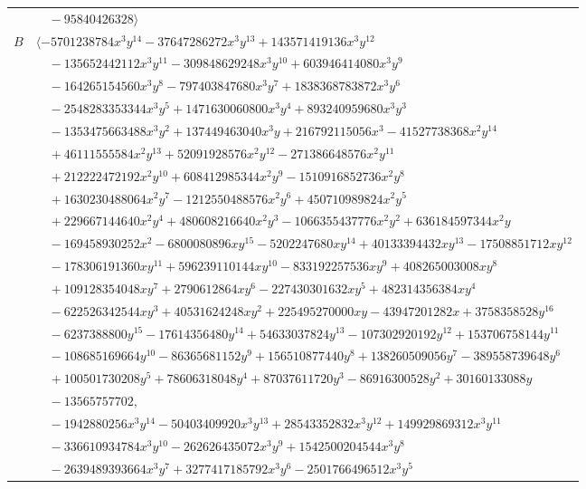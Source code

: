 \documentclass[11pt]{article}
\begin{document}
\begin{longtable}{@{}ll@{}}
 & $\quad -95840426328\rangle$\\
$B$ & $\langle -5701238784x^{3}y^{14}-37647286272x^{3}y^{13}+143571419136x^{3}y^{12}$\\
 & $\quad -135652442112x^{3}y^{11}-309848629248x^{3}y^{10}+603946414080x^{3}y^{9}$\\
 & $\quad -164265154560x^{3}y^{8}-797403847680x^{3}y^{7}+1838368783872x^{3}y^{6}$\\
 & $\quad -2548283353344x^{3}y^{5}+1471630060800x^{3}y^{4}+893240959680x^{3}y^{3}$\\
 & $\quad -1353475663488x^{3}y^{2}+137449463040x^{3}y+216792115056x^{3}-41527738368x^{2}y^{14}$\\
 & $\quad +46111555584x^{2}y^{13}+52091928576x^{2}y^{12}-271386648576x^{2}y^{11}$\\
 & $\quad +212222472192x^{2}y^{10}+608412985344x^{2}y^{9}-1510916852736x^{2}y^{8}$\\
 & $\quad +1630230488064x^{2}y^{7}-1212550488576x^{2}y^{6}+450710989824x^{2}y^{5}$\\
 & $\quad +229667144640x^{2}y^{4}+480608216640x^{2}y^{3}-1066355437776x^{2}y^{2}+636184597344x^{2}y$\\
 & $\quad -169458930252x^{2}-6800080896xy^{15}-5202247680xy^{14}+40133394432xy^{13}-17508851712xy^{12}$\\
 & $\quad -178306191360xy^{11}+596239110144xy^{10}-833192257536xy^{9}+408265003008xy^{8}$\\
 & $\quad +109128354048xy^{7}+2790612864xy^{6}-227430301632xy^{5}+482314356384xy^{4}$\\
 & $\quad -622526342544xy^{3}+40531624248xy^{2}+225495270000xy-43947201282x+3758358528y^{16}$\\
 & $\quad -6237388800y^{15}-17614356480y^{14}+54633037824y^{13}-107302920192y^{12}+153706758144y^{11}$\\
 & $\quad -108685169664y^{10}-86365681152y^{9}+156510877440y^{8}+138260509056y^{7}-389558739648y^{6}$\\
 & $\quad +100501730208y^{5}+78606318048y^{4}+87037611720y^{3}-86916300528y^{2}+30160133088y$\\
 & $\quad -13565757702,$\\
 & $\quad -1942880256x^{3}y^{14}-50403409920x^{3}y^{13}+28543352832x^{3}y^{12}+149929869312x^{3}y^{11}$\\
 & $\quad -336610934784x^{3}y^{10}-262626435072x^{3}y^{9}+1542500204544x^{3}y^{8}$\\
 & $\quad -2639489393664x^{3}y^{7}+3277417185792x^{3}y^{6}-2501766496512x^{3}y^{5}$\\

\end{longtable}
\end{document}
